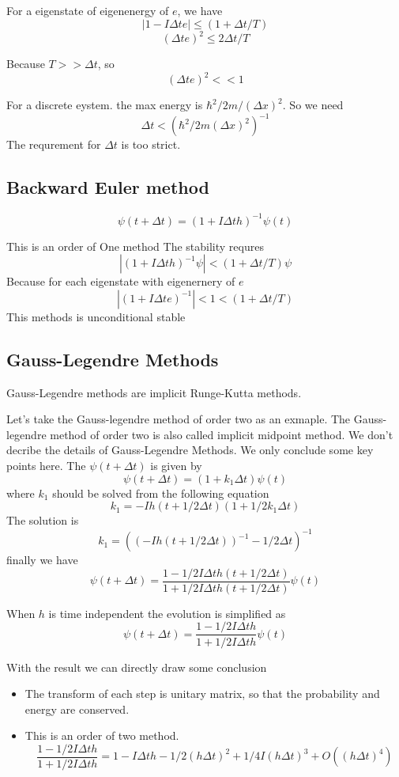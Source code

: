 \documentclass[12pt,twoside]{article}
\begin{document}
 For a eigenstate of eigenenergy of $e$, we have
$$
| 1 - I \Delta t e| \le (1 + \Delta t / T)
$$
$$
(\Delta t e)^2 \le 2 \Delta t / T
$$

Because $T >> \Delta t$, so
$$
(\Delta t e)^2 << 1
$$

For a discrete eystem. the max energy is $\hbar^2/2m/(\Delta x)^2$. So we need
$$
\Delta t < (\hbar^2/2m(\Delta x)^2)^{-1}
$$
The requrement for $\Delta t$ is too strict.

\subsection{Backward Euler method}

$$
\psi(t + \Delta t) = (1 + I \Delta t h)^{-1} \psi(t)
$$

This is an order of One method
The stability requres
$$
|(1 + I \Delta t h)^{-1}\psi| < (1 + \Delta t / T) \psi
$$
Because for each eigenstate with eigenernery of $e$
$$
|(1 + I \Delta t e)^{-1}| < 1 < (1 + \Delta t / T)
$$
This methods is unconditional stable

\subsection{Gauss-Legendre Methods}

Gauss-Legendre methods are implicit Runge-Kutta methods.

Let's take the Gauss-legendre method of order two as an exmaple. The Gauss-legendre method of order two is also called implicit midpoint method.
We don't decribe the details of Gauss-Legendre Methods. We only conclude some key points here.
The $\psi(t+\Delta t)$ is given by
$$
\psi(t+\Delta t) = (1+k_1\Delta t) \psi(t)
$$
where $k_1$ should be solved from the following equation
$$
k_1 = - I h(t+1/2\Delta t) (1 + 1/2 k_1\Delta t)
$$
The solution is
$$
k_1 = ((-I h(t+1/2\Delta t))^{-1} - 1/2 \Delta t)^{-1}
$$
finally we have
$$
\psi(t+\Delta t) = \frac{1 - 1/2 I \Delta t h(t+1/2\Delta t)} {1 + 1/2 I \Delta t h(t+1/2\Delta t)} \psi(t)
$$

When $h$ is time independent the evolution is simplified as
$$
\psi(t + \Delta t) = \frac{1 - 1/2 I \Delta t h} {1 + 1/2 I \Delta t h} \psi(t)
$$

With the result we can directly draw some conclusion

\begin{itemize}
  \item The transform of each step is unitary matrix, so that the probability and energy are conserved.
  \item This is an order of two method.
$$
\frac{1 - 1/2 I \Delta t h} {1 + 1/2 I \Delta t h}
= 1- I \Delta t h - 1/2(h\Delta t)^2+ 1/4 I(h\Delta t)^3 + O((h\Delta t)^4)
$$
\end{itemize}
\end{document}
